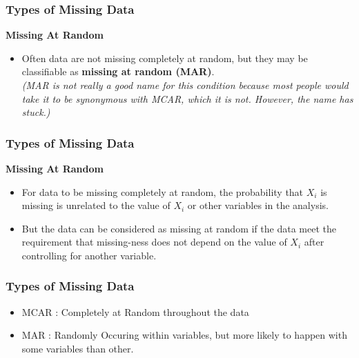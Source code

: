 \documentclass[MASTER.tex]{subfiles}
\begin{document}
	\begin{frame}
		\frametitle{Types of Missing Data}
		\Large
\noindent \textbf{Missing At Random}
		\begin{itemize}
\item Often data are not missing completely at random, but they may be classifiable as \textbf{missing at random (MAR)}.\\\textit{ (MAR is not really a good name for this condition because most people would take it to be synonymous with MCAR, which it is not. However, the name has stuck.)}
\end{itemize}
\end{frame}
\begin{frame}
	\frametitle{Types of Missing Data}
	\Large
	\noindent \textbf{Missing At Random}
	\begin{itemize}
		
\item For data to be missing completely at random, the probability that $X_i$ is missing is unrelated to the value of  $X_i$ or other variables in the analysis. 
\item But the data can be considered as missing at random if the data meet the requirement that missing-ness does not depend on the value of $X_i$ after controlling for another variable.
\end{itemize}
\end{frame}
\begin{frame}
	\frametitle{Types of Missing Data}
	\Large
	\noindent 
	\begin{itemize}
		\item MCAR :  Completely at Random throughout the data
		\item MAR :  Randomly Occuring within variables, but more likely to happen with some variables than other.
	\end{itemize}
\end{frame}
%
\end{document}
